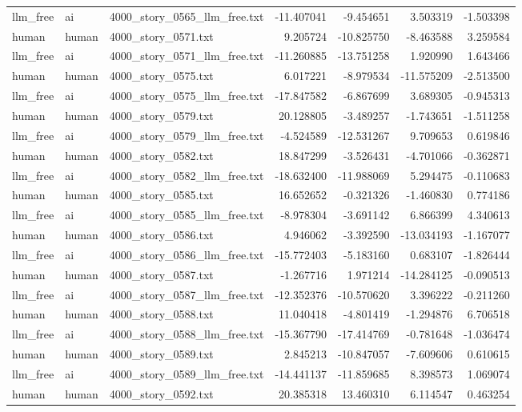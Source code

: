 \begin{longtable}{lllrrrr}
llm\_free & ai & 4000\_story\_0565\_llm\_free.txt & -11.407041 & -9.454651 & 3.503319 & -1.503398 \\
human & human & 4000\_story\_0571.txt & 9.205724 & -10.825750 & -8.463588 & 3.259584 \\
llm\_free & ai & 4000\_story\_0571\_llm\_free.txt & -11.260885 & -13.751258 & 1.920990 & 1.643466 \\
human & human & 4000\_story\_0575.txt & 6.017221 & -8.979534 & -11.575209 & -2.513500 \\
llm\_free & ai & 4000\_story\_0575\_llm\_free.txt & -17.847582 & -6.867699 & 3.689305 & -0.945313 \\
human & human & 4000\_story\_0579.txt & 20.128805 & -3.489257 & -1.743651 & -1.511258 \\
llm\_free & ai & 4000\_story\_0579\_llm\_free.txt & -4.524589 & -12.531267 & 9.709653 & 0.619846 \\
human & human & 4000\_story\_0582.txt & 18.847299 & -3.526431 & -4.701066 & -0.362871 \\
llm\_free & ai & 4000\_story\_0582\_llm\_free.txt & -18.632400 & -11.988069 & 5.294475 & -0.110683 \\
human & human & 4000\_story\_0585.txt & 16.652652 & -0.321326 & -1.460830 & 0.774186 \\
llm\_free & ai & 4000\_story\_0585\_llm\_free.txt & -8.978304 & -3.691142 & 6.866399 & 4.340613 \\
human & human & 4000\_story\_0586.txt & 4.946062 & -3.392590 & -13.034193 & -1.167077 \\
llm\_free & ai & 4000\_story\_0586\_llm\_free.txt & -15.772403 & -5.183160 & 0.683107 & -1.826444 \\
human & human & 4000\_story\_0587.txt & -1.267716 & 1.971214 & -14.284125 & -0.090513 \\
llm\_free & ai & 4000\_story\_0587\_llm\_free.txt & -12.352376 & -10.570620 & 3.396222 & -0.211260 \\
human & human & 4000\_story\_0588.txt & 11.040418 & -4.801419 & -1.294876 & 6.706518 \\
llm\_free & ai & 4000\_story\_0588\_llm\_free.txt & -15.367790 & -17.414769 & -0.781648 & -1.036474 \\
human & human & 4000\_story\_0589.txt & 2.845213 & -10.847057 & -7.609606 & 0.610615 \\
llm\_free & ai & 4000\_story\_0589\_llm\_free.txt & -14.441137 & -11.859685 & 8.398573 & 1.069074 \\
human & human & 4000\_story\_0592.txt & 20.385318 & 13.460310 & 6.114547 & 0.463254 \\

\end{longtable}
